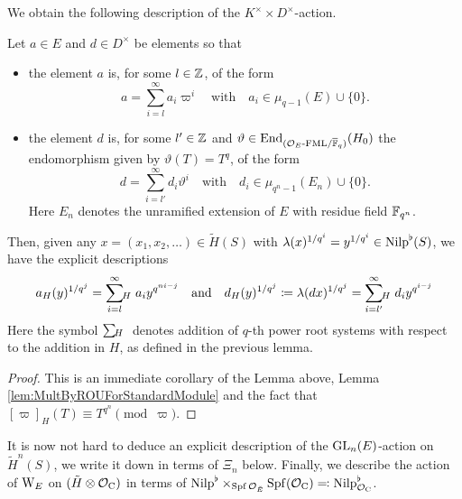\documentclass[../main.tex]{subfiles}
\begin{document}
We obtain the following description of the $K^\times \times D^\times$-action.

\begin{cor}\label{cor:ExplicitDescriptionOfActionOnUnivCov}
  Let $a \in E$ and $d \in D^\times$ be elements so that
  \begin{itemize}
    \item the element $a$ is, for some $l \in \mathbb{Z}$, of the form
      \begin{equation*}
        a = \sum_{i = l}^\infty a_i \varpi^i \quad \text{with} \quad
        a_i \in \mu_{q-1}(E) \cup \{0\}.
      \end{equation*}
    \item the element $d$ is, for some $l' \in \mathbb{Z}$ and 
      $\vartheta \in \operatorname{End}_{{({\mathcal{O}_E}\text-\allowbreak\mathrm{FML}/{{\overline {\mathbb{F}}_q}})}} (H_0)$ the endomorphism given
      by $\vartheta(T) = T^q$, of the form
      \begin{equation*}
        d = \sum_{i = l'}^\infty d_i \vartheta^i \quad \text{with} \quad
        d_i \in \mu_{q^n-1}(E_n) \cup \{0\}.
      \end{equation*}
      Here $E_n$ denotes the unramified extension of $E$ with residue field 
      $\mathbb{F}_{q^n}$. 
  \end{itemize}
  Then, given any $x = (x_1, x_2, \dots)
  \in \tilde H(S)$ with $\lambda(x)^{1/q^i} = y^{1/q^i} \in {\mathrm{Nilp}}^\flat(S)$, we
  have the explicit descriptions
  \begin{equation*}
    a_H(y)^{1/q^j}  = \sum_{i=l}^\infty{\hspace{-3pt}}_H\hspace{3pt} a_i y^{q^{ni-j}}
  \quad \text{and} \quad
  d_H(y)^{1/q^j} \coloneqq \lambda(dx)^{1/q^j} = \sum_{i=l'}^\infty {\hspace{-3pt}}_H\hspace{3pt} d_i y^{q^{i-j}}
  \end{equation*}
  Here the symbol $\sum {\hspace{-3pt}}_H\hspace{3pt}$ \hspace{-10pt} denotes addition of $q$-th power
  root systems with
  respect to the addition in $H$, as defined in the previous lemma.
  \begin{proof}
    This is an immediate corollary of the Lemma above, Lemma
    \ref{lem:MultByROUForStandardModule} and the fact that 
    $[\varpi]_H(T) \equiv T^{q^n} \pmod \varpi$. 
  \end{proof}
\end{cor}

It is now not hard to deduce an explicit description of the $\operatorname{GL}_n(E)$-action
on $\tilde H^n(S)$, we write it down in terms of $\Xi_n$ below. Finally, we
describe the action of $\mathrm W_E$ on $(\tilde H \otimes \mathcal{O}_{\mathrm{C}})$ in terms
of ${\mathrm{Nilp}}^\flat \times_{\operatorname{Spf} \mathcal{O}_{\breve {E}}} \operatorname{Spf}(\mathcal{O}_{\mathrm{C}}) \eqcolon {\mathrm{Nilp}}^\flat_{\mathcal{O}_{\mathrm{C}}}$.
\end{document}
